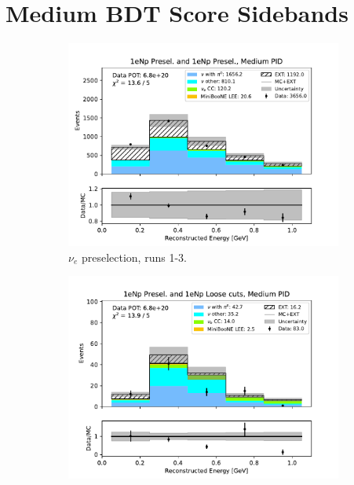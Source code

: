 \section{Medium BDT Score Sidebands}
\label{sec:MediumBDTScoreSidebands}

\begin{figure}[H]
    \centering
    \begin{subfigure}{0.5\linewidth}
        \includegraphics[width=\linewidth]{technote/Sidebands/Figures/NearSideband/near_sideband_reco_e_run123_NP_NP_MEDIUM_PID.pdf}
        \caption{$\nu_e$ preselection, runs 1-3.}
    \end{subfigure}%
    \begin{subfigure}{0.5\linewidth}
        \includegraphics[width=\linewidth]{technote/Sidebands/Figures/NearSideband/near_sideband_reco_e_run123_NP_NPL_MEDIUM_PID.pdf}

\end{subfigure}
\end{figure}

